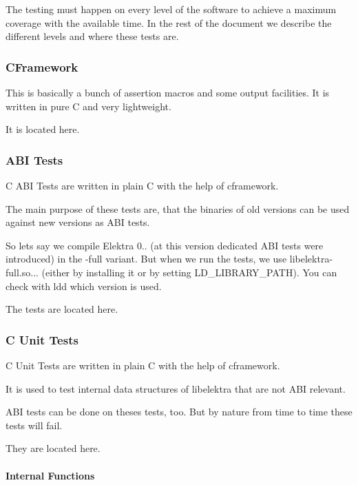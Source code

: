 The testing must happen on every level of the software to achieve a maximum coverage with the available time. In the rest of the document we describe the different levels and where these tests are.

\subsubsection*{C\+Framework}

This is basically a bunch of assertion macros and some output facilities. It is written in pure C and very lightweight.

It is located here.

\subsubsection*{A\+BI Tests}

C A\+BI Tests are written in plain C with the help of {\ttfamily cframework}.

The main purpose of these tests are, that the binaries of old versions can be used against new versions as A\+BI tests.

So lets say we compile Elektra 0.. (at this version dedicated A\+BI tests were introduced) in the {\ttfamily -\/full} variant. But when we run the tests, we use {\ttfamily libelektra-\/full.\+so...} (either by installing it or by setting {\ttfamily L\+D\+\_\+\+L\+I\+B\+R\+A\+R\+Y\+\_\+\+P\+A\+TH}). You can check with {\ttfamily ldd} which version is used.

The tests are located here.

\subsubsection*{C Unit Tests}

C Unit Tests are written in plain C with the help of {\ttfamily cframework}.

It is used to test internal data structures of libelektra that are not A\+BI relevant.

A\+BI tests can be done on theses tests, too. But by nature from time to time these tests will fail.

They are located here.

\paragraph*{Internal Functions}

